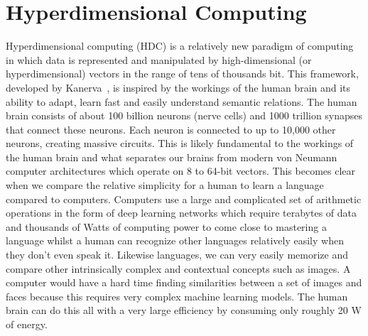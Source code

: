 \chapter[Hyperdimensional computing]{Hyperdimensional Computing}
Hyperdimensional computing (HDC) is a relatively new paradigm of computing in which data is represented and manipulated by high-dimensional (or hyperdimensional) vectors in the range of tens of thousands bit. This framework, developed by Kanerva~\cite{Kanerva2009}, is inspired by the workings of the human brain and its ability to adapt, learn fast and easily understand semantic relations. The human brain consists of about 100 billion neurons (nerve cells) and 1000 trillion synapses that connect these neurons. Each neuron is connected to up to 10,000 other neurons, creating massive circuits. This is likely fundamental to the workings of the human brain and what separates our brains from modern von Neumann computer architectures which operate on 8 to 64-bit vectors. This becomes clear when we compare the relative simplicity for a human to learn a language compared to computers. Computers use a large and complicated set of arithmetic operations in the form of deep learning networks which require terabytes of data and thousands of Watts of computing power to come close to mastering a language whilst a human can recognize other languages relatively easily when they don't even speak it. Likewise languages, we can very easily memorize and compare other intrinsically complex and contextual concepts such as images. A computer would have a hard time finding similarities between a set of images and faces because this requires very complex machine learning models. The human brain can do this all with a very large efficiency by consuming only roughly 20 W of energy.

